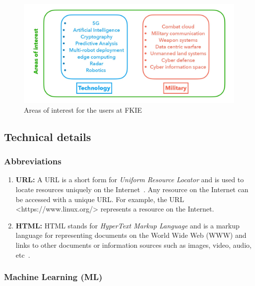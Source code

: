 \documentclass[master,proposal,extern,palatino]{rgseThesis}
\begin{document}
	\begin{figure}[h]
		\centering
		\includegraphics[width=.7\textwidth]{images/keynotes_images/areas_of_interest.jpg}
		\caption{Areas of interest for the users at FKIE \label{fig:areas_of_interest}}
	\end{figure} 

\subsection{Technical details}
\subsubsection{Abbreviations}

\begin{enumerate}
	\item{\textbf{URL:}} A URL is a short form for \textit{Uniform Resource Locator} and is used to locate resources uniquely on the Internet~\cite{berners1994uniform}. Any resource on the Internet can be accessed with a unique URL. For example, the URL <https://www.linux.org/> represents a resource on the Internet. 

	\item{\textbf{HTML:}} HTML stands for \textit{HyperText Markup Language} and is a markup language for representing documents on the World Wide Web (WWW) and links to other documents or information sources such as images, video, audio, etc~\cite{html}.
\end{enumerate}	


\subsubsection{Machine Learning (ML)}
\end{document}
